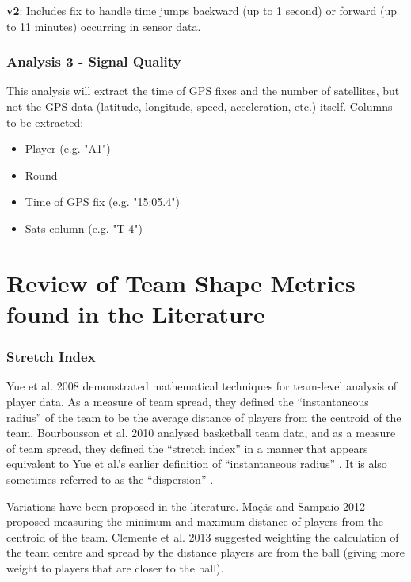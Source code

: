 \textbf{v2}: Includes fix to handle time jumps backward (up to 1 second) or forward (up to 11 minutes) occurring in sensor data.

\subsubsection{Analysis 3 - Signal Quality}
This analysis will extract the time of GPS fixes and the number of satellites, but not the GPS data (latitude, longitude, speed, acceleration, etc.) itself. Columns to be extracted:

\begin{itemize}
  \item Player (e.g. "A1")
  \item Round
  \item Time of GPS fix (e.g. "15:05.4")
  \item Sats column (e.g. "T 4")
\end{itemize}


\section{Review of Team Shape Metrics found in the Literature}
\label{appendixsec:measures-of-team-shape}

\subsubsection{Stretch Index}
\label{sec:stretch-index}


Yue et al. 2008 \cite{Yue2008} demonstrated mathematical techniques for team-level analysis of \soccer{} player data. As a measure of team spread, they defined the ``instantaneous radius'' of the team to be the average distance of players from the centroid of the team. Bourbousson et al. 2010 \cite{Bourbousson2010b} analysed basketball team data, and as a measure of team spread, they defined the ``stretch index'' in a manner that appears equivalent to Yue et al.'s earlier definition of ``instantaneous radius'' \cite{Yue2008}. It is also sometimes referred to as the ``dispersion'' \cite{Frias2014}.

Variations have been proposed in the literature. Ma\c{c}\~{a}s and Sampaio 2012 \cite{Macas2012} proposed measuring the minimum and maximum distance of players from the centroid of the team. Clemente et al. 2013 \cite{Clemente2013a} suggested weighting the calculation of the team centre and spread by the distance players are from the ball (giving more weight to players that are closer to the ball).

